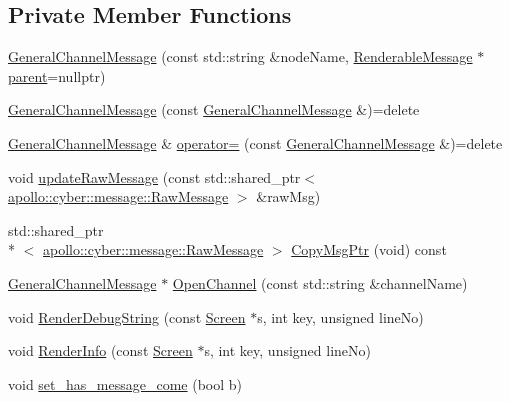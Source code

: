 \subsection*{Private Member Functions}
\begin{DoxyCompactItemize}
\item 
\hyperlink{classGeneralChannelMessage_a390e8b45e9b980c6cc6e2f3c1d36ece9}{General\-Channel\-Message} (const std\-::string \&node\-Name, \hyperlink{classRenderableMessage}{Renderable\-Message} $\ast$\hyperlink{classRenderableMessage_ab23728d14d9aff3efa0af7639ec6059c}{parent}=nullptr)
\item 
\hyperlink{classGeneralChannelMessage_ac6269c5ac192942c72566f2a6399e465}{General\-Channel\-Message} (const \hyperlink{classGeneralChannelMessage}{General\-Channel\-Message} \&)=delete
\item 
\hyperlink{classGeneralChannelMessage}{General\-Channel\-Message} \& \hyperlink{classGeneralChannelMessage_ab6a1a17b601ac4b41e687022ff0ec434}{operator=} (const \hyperlink{classGeneralChannelMessage}{General\-Channel\-Message} \&)=delete
\item 
void \hyperlink{classGeneralChannelMessage_aefdf77ab4c8e43b86af7128aaaa5ccac}{update\-Raw\-Message} (const std\-::shared\-\_\-ptr$<$ \hyperlink{structapollo_1_1cyber_1_1message_1_1RawMessage}{apollo\-::cyber\-::message\-::\-Raw\-Message} $>$ \&raw\-Msg)
\item 
std\-::shared\-\_\-ptr\\*
$<$ \hyperlink{structapollo_1_1cyber_1_1message_1_1RawMessage}{apollo\-::cyber\-::message\-::\-Raw\-Message} $>$ \hyperlink{classGeneralChannelMessage_a347060b4136af1997b77ac6671dbb860}{Copy\-Msg\-Ptr} (void) const 
\item 
\hyperlink{classGeneralChannelMessage}{General\-Channel\-Message} $\ast$ \hyperlink{classGeneralChannelMessage_ae1bc06baa0d31bb6757fb5d27f034da9}{Open\-Channel} (const std\-::string \&channel\-Name)
\item 
void \hyperlink{classGeneralChannelMessage_a47717a3ab362e45cad05f94495168386}{Render\-Debug\-String} (const \hyperlink{classScreen}{Screen} $\ast$s, int key, unsigned line\-No)
\item 
void \hyperlink{classGeneralChannelMessage_a15801ad66f9891d77cb9dbe3e606803e}{Render\-Info} (const \hyperlink{classScreen}{Screen} $\ast$s, int key, unsigned line\-No)
\item 
void \hyperlink{classGeneralChannelMessage_ac5344c725f27ad9bd126cc67a8a2238a}{set\-\_\-has\-\_\-message\-\_\-come} (bool b)
\end{DoxyCompactItemize}
